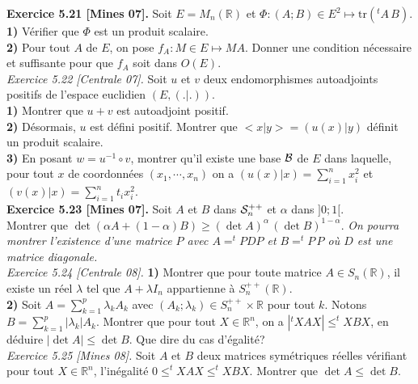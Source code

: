 \documentclass[a4paper,12pt,francais]{article}
\newcommand{\field}[1]{\mathbb{#1}}
\newcommand{\R}{\field{R}}
\newcommand{\tr}{\mbox{tr}}
\begin{document}
\noindent
{\bf Exercice 5.21 [Mines 07].} Soit $E=M_n(\R)$ et $\Phi:(A;B)\in E^2 \mapsto \tr(^tA\, B)$.\\
\indent
{\bf 1)} Vérifier que $\Phi$ est un produit scalaire.\\
\indent
{\bf 2)} Pour tout $A$ de $E$, on pose $f_A: M \in E \mapsto MA$. Donner une condition nécessaire et suffisante pour que $f_A$ soit dans $O(E)$.\\

\noindent
{\it Exercice 5.22 [Centrale 07].} Soit $u$ et $v$ deux endomorphismes autoadjoints positifs de l'espace euclidien $(E,(.|.))$.\\
\indent
{\bf 1)} Montrer que $u+v$ est autoadjoint positif.\\
\indent
{\bf 2)} Désormais, $u$ est défini positif. Montrer que $<x|y>=(u(x)|y)$ définit un produit scalaire.\\
\indent
{\bf 3)} En posant $w=u^{-1}\circ v$, montrer qu'il existe une base $\cal{B}$ de $E$ dans laquelle, pour tout $x$ de coordonnées $(x_1,\cdots,x_n)$ on a $\displaystyle (u(x)|x)=\sum_{i=1}^n x_i^2$ et $\displaystyle (v(x)|x)=\sum_{i=1}^n t_i x_i^2$.\\ 

\noindent
{\bf Exercice 5.23 [Mines 07].} Soit $A$ et $B$ dans ${\cal{S}}_n^{++}$ et $\alpha$ dans $]0;1[$.\\
Montrer que $\det(\alpha A+(1-\alpha)B) \geqslant (\det A)^\alpha \, (\det B)^{1-\alpha}$. {\it On pourra montrer l'existence d'une matrice $P$ avec $A=^t PDP$ et $B=^tP\, P$ où $D$ est une matrice diagonale.}\\

\noindent
{\it Exercice 5.24 [Centrale 08].} {\bf1)} Montrer que pour toute matrice $A\in S_n(\R)$, il existe un réel $\lambda$ tel que $A+\lambda I_n $ appartienne à $S_n^{++}(\R)$.\\
{\bf 2)} Soit $A=\displaystyle \sum_{k=1}^p \lambda_kA_k$ avec $(A_k;\lambda_k)\in S_n^{++}\times \R$ pour tout $k$. Notons 
 $B=\displaystyle \sum_{k=1}^p |\lambda_k| A_k$. Montrer que pour tout $X\in \R^n$, on a $|^tX A X| \leqslant ^tX BX$, en déduire $|\det A|\leqslant \det B$. Que dire du cas d'égalité?\\
 
 \noindent
 {\it Exercice 5.25 [Mines 08].} Soit $A$ et $B$ deux matrices symétriques réelles vérifiant pour tout $X \in \R^n$, l'inégalité $0 \leqslant ^tXAX \leqslant ^tXBX$. Montrer que $\det A \leqslant \det B$.\\
 
\end{document}
